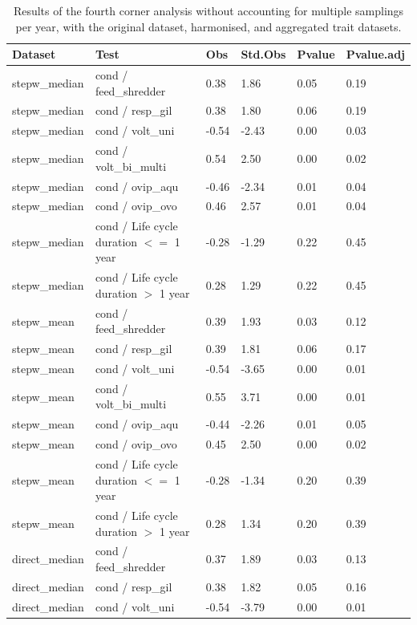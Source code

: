 \documentclass[12pt]{article}
\begin{document}
\begin{longtable}[H]{m{2.6cm}|m{7.3cm}|m{1cm}|m{1.4cm}|m{1.5cm}|m{1.5cm}}
    \caption{Results of the fourth corner analysis without accounting for multiple samplings per year, with the original dataset, harmonised, and aggregated trait datasets.}
    \label{stab:fc_selected_full}
    \endfirsthead
    \toprule[.1em]
    Dataset & Test & Obs & Std.Obs & Pvalue & Pvalue.adj \\ 
    \toprule[.1em]
    stepw\_median & cond / feed\_shredder & 0.38 & 1.86 & 0.05 & 0.19 \\ 
      stepw\_median & cond / resp\_gil & 0.38 & 1.80 & 0.06 & 0.19 \\ 
      stepw\_median & cond / volt\_uni & -0.54 & -2.43 & 0.00 & 0.03 \\ 
      stepw\_median & cond / volt\_bi\_multi & 0.54 & 2.50 & 0.00 & 0.02 \\ 
      stepw\_median & cond / ovip\_aqu & -0.46 & -2.34 & 0.01 & 0.04 \\ 
      stepw\_median & cond / ovip\_ovo & 0.46 & 2.57 & 0.01 & 0.04 \\ 
      stepw\_median & cond / Life cycle duration $<=$ 1 year & -0.28 & -1.29 & 0.22 & 0.45 \\ 
      stepw\_median & cond / Life cycle duration $>$ 1 year & 0.28 & 1.29 & 0.22 & 0.45 \\ 
      stepw\_mean & cond / feed\_shredder & 0.39 & 1.93 & 0.03 & 0.12 \\ 
      stepw\_mean & cond / resp\_gil & 0.39 & 1.81 & 0.06 & 0.17 \\ 
      stepw\_mean & cond / volt\_uni & -0.54 & -3.65 & 0.00 & 0.01 \\ 
      stepw\_mean & cond / volt\_bi\_multi & 0.55 & 3.71 & 0.00 & 0.01 \\ 
      stepw\_mean & cond / ovip\_aqu & -0.44 & -2.26 & 0.01 & 0.05 \\ 
      stepw\_mean & cond / ovip\_ovo & 0.45 & 2.50 & 0.00 & 0.02 \\ 
      stepw\_mean & cond / Life cycle duration $<=$ 1 year & -0.28 & -1.34 & 0.20 & 0.39 \\ 
      stepw\_mean & cond / Life cycle duration $>$ 1 year & 0.28 & 1.34 & 0.20 & 0.39 \\ 
      direct\_median & cond / feed\_shredder & 0.37 & 1.89 & 0.03 & 0.13 \\ 
      direct\_median & cond / resp\_gil & 0.38 & 1.82 & 0.05 & 0.16 \\ 
      direct\_median & cond / volt\_uni & -0.54 & -3.79 & 0.00 & 0.01 \\ 

\end{longtable}
\end{document}
